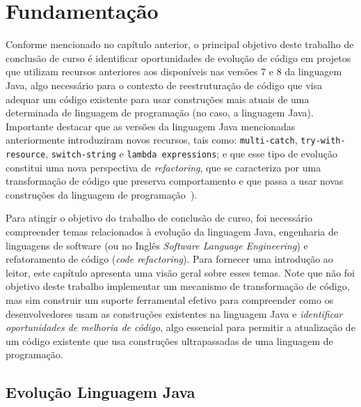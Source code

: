 %
%
\chapter{Fundamentaç\~{a}o}

Conforme mencionado no cap\'{i}tulo anterior, 
o principal objetivo deste trabalho de conclus\~{a}o de curso \'{e} 
identificar oportunidades de evoluç\~{a}o de c\'{o}digo 
em projetos que utilizam recursos anteriores aos dispon\'{i}veis 
nas vers\~{o}es 7 e 8 da linguagem Java, 
algo necess\'{a}rio para o contexto de 
reestrutura\c c\~{a}o de c\'{o}digo que visa adequar um c\'{o}digo 
existente para usar constru\c c\~{o}es mais atuais 
de uma determinada de linguagem de programa\c c\~{a}o 
(no caso, a linguagem Java). Importante destacar 
que as vers\~{o}es da linguagem Java mencionadas anteriormente
introduziram novos recursos, tais como: 
\texttt{multi-catch}, \texttt{try-with-resource}, \texttt{switch-string} 
e \texttt{lambda expressions}; e que esse tipo de 
evoluç\~{a}o constitui uma nova perspectiva 
de \textit{refactoring}, que se caracteriza 
por uma transforma\c c\~{a}o de c\'{o}digo que 
preserva comportamento e que passa a usar  
novas constru\c c\~{o}es da linguagem de programa\c c\~{a}o~\cite{Overbey:2009}). 

Para atingir o objetivo do trabalho de conclus\~{a}o de curso, 
foi necess\'{a}rio compreender temas relacionados 
\`{a} evolu\c c\~{a}o da linguagem Java, engenharia de 
linguagens de software (ou no Ingl\^{e}s \emph{Software 
Language Engineering}) e refatoramento de c\'{o}digo 
(\emph{code refactoring}). Para fornecer uma introdu\c c\~{a}o ao leitor, 
este cap\'{i}tulo apresenta 
uma vis\~{a}o geral sobre esses temas. Note que n\~{a}o foi objetivo
deste trabalho implementar um mecanismo de transforma\c c\~{a}o 
de c\'{o}digo, mas sim construir um suporte ferramental 
efetivo para compreender como os desenvolvedores usam as 
constru\c c\~{o}es existentes na linguagem Java e \emph{identificar 
oportunidades de melhoria de c\'{o}digo}, algo essencial para 
permitir a atualiza\c c\~{a}o de um c\'{o}digo existente 
que usa constru\c c\~{o}es ultrapassadas de uma 
linguagem de programa\c c\~{a}o. 
 
\section{Evoluç\~{a}o Linguagem Java}\label{sec:evolucaoJava}



